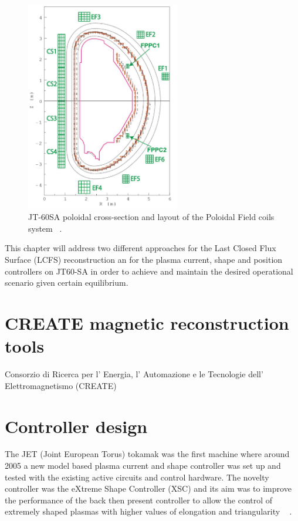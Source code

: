 \begin{figure}
	\centering
	\includegraphics[width=0.6\textwidth]{Chp3/JT60Coils.png}

	\caption{	\label{JT60coils}JT-60SA poloidal cross-section and layout of the Poloidal Field coils system ~\cite{NCruz}.}
\end{figure}


This chapter will address two different approaches for the Last Closed Flux Surface (LCFS) reconstruction an for the  plasma current, shape and position controllers on  JT60-SA in order to achieve and maintain the desired operational scenario given certain equilibrium. 

\section{CREATE magnetic reconstruction tools}
Consorzio di Ricerca per l' Energia, l' Automazione e le Tecnologie dell' Elettromagnetismo (CREATE)

\section{Controller design}
The JET (Joint European Torus) tokamak was the first machine where around 2005 a new model based plasma current and shape controller was set up and tested  with the existing active circuits and control hardware. The novelty controller was the eXtreme Shape Controller (XSC) and its aim was to improve  the performance of the back then present controller to allow the control of extremely shaped plasmas with higher values of elongation and triangularity ~\cite{Albanese2005} . 
 

